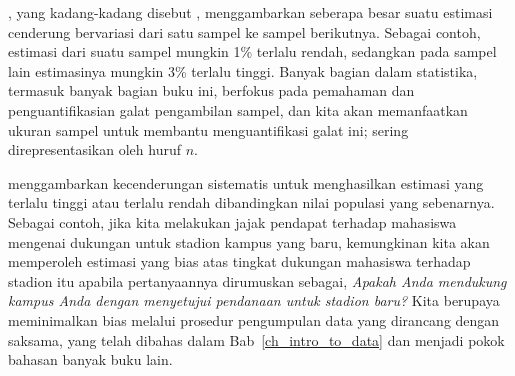 


,
yang kadang-kadang disebut \emph{},
menggambarkan seberapa besar suatu estimasi cenderung bervariasi dari
satu sampel ke sampel berikutnya.
Sebagai contoh, estimasi dari suatu sampel mungkin 1\% terlalu rendah,
sedangkan pada sampel lain estimasinya mungkin 3\% terlalu tinggi.
Banyak bagian dalam statistika, termasuk banyak bagian buku ini,
berfokus pada pemahaman dan penguantifikasian galat pengambilan sampel,
dan kita akan memanfaatkan ukuran sampel
untuk membantu menguantifikasi galat ini;
 sering direpresentasikan oleh huruf $n$.

 menggambarkan kecenderungan sistematis
untuk menghasilkan estimasi yang terlalu tinggi atau terlalu rendah
dibandingkan nilai populasi yang sebenarnya.
Sebagai contoh, jika kita melakukan jajak pendapat terhadap mahasiswa mengenai
dukungan untuk stadion kampus yang baru, kemungkinan kita akan
memperoleh estimasi yang bias atas tingkat dukungan mahasiswa
terhadap stadion itu apabila pertanyaannya dirumuskan sebagai,
\emph{Apakah Anda mendukung kampus Anda dengan menyetujui pendanaan
  untuk stadion baru?}
Kita berupaya meminimalkan bias melalui prosedur pengumpulan
data yang dirancang dengan saksama, yang telah dibahas dalam
Bab~\ref{ch_intro_to_data}
dan menjadi pokok bahasan banyak buku lain.

